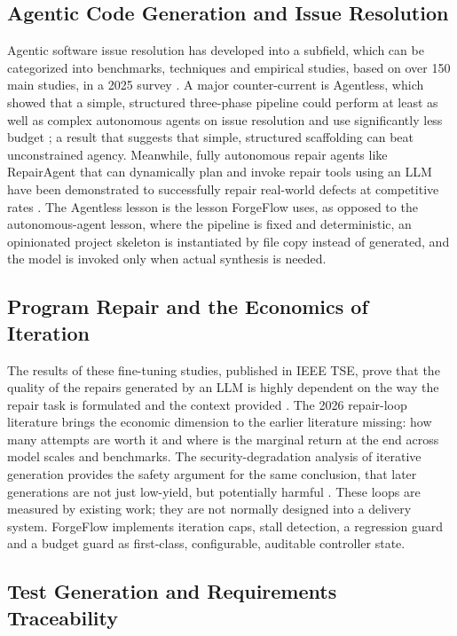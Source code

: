 \documentclass[pdflatex,sn-mathphys-num]{sn-jnl}%
\theoremstyle{thmstyleone}%
\theoremstyle{thmstyletwo}%
\theoremstyle{thmstylethree}%
\begin{document}
\subsection{Agentic Code Generation and Issue Resolution}\label{sec2.1}

Agentic software issue resolution has developed into a subfield, which can be categorized into benchmarks, techniques and empirical studies, based on over 150 main studies, in a 2025 survey \cite{r12jiang}. A major counter-current is Agentless, which showed that a simple, structured three-phase pipeline could perform at least as well as complex autonomous agents on issue resolution and use significantly less budget \cite{r13xia}; a result that suggests that simple, structured scaffolding can beat unconstrained agency. Meanwhile, fully autonomous repair agents like RepairAgent that can dynamically plan and invoke repair tools using an LLM have been demonstrated to successfully repair real-world defects at competitive rates \cite{r14bouzenia}. The Agentless lesson is the lesson ForgeFlow uses, as opposed to the autonomous-agent lesson, where the pipeline is fixed and deterministic, an opinionated project skeleton is instantiated by file copy instead of generated, and the model is invoked only when actual synthesis is needed.

\subsection{Program Repair and the Economics of Iteration}\label{sec2.2}

The results of these fine-tuning studies, published in IEEE TSE, prove that the quality of the repairs generated by an LLM is highly dependent on the way the repair task is formulated and the context provided \cite{r15huang}. The 2026 repair-loop literature brings the economic dimension to the earlier literature missing: how many attempts are worth it \cite{r09kiecker} and where is the marginal return at the end \cite{r10arimbur} across model scales and benchmarks. The security-degradation analysis of iterative generation provides the safety argument for the same conclusion, that later generations are not just low-yield, but potentially harmful \cite{r05shukla}. These loops are measured by existing work; they are not normally designed into a delivery system. ForgeFlow implements iteration caps, stall detection, a regression guard and a budget guard as first-class, configurable, auditable controller state.

\subsection{Test Generation and Requirements Traceability}\label{sec2.3}
\end{document}
